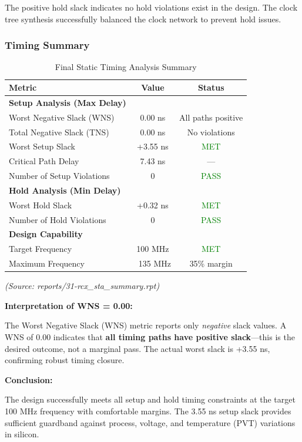 \documentclass[12pt,a4paper]{article}
\begin{document}
The positive hold slack indicates no hold violations exist in the design. The clock tree synthesis successfully balanced the clock network to prevent hold issues.

\subsubsection{Timing Summary}

\begin{table}[H]
\centering
\caption{Final Static Timing Analysis Summary}
\label{tab:final_sta}
\begin{tabular}{@{}lcc@{}}
\toprule
\textbf{Metric} & \textbf{Value} & \textbf{Status} \\
\midrule
\textbf{Setup Analysis (Max Delay)} & & \\
Worst Negative Slack (WNS) & 0.00 ns & All paths positive \\
Total Negative Slack (TNS) & 0.00 ns & No violations \\
Worst Setup Slack & +3.55 ns & \textcolor{green}{MET} \\
Critical Path Delay & 7.43 ns & — \\
Number of Setup Violations & 0 & \textcolor{green}{PASS} \\
\midrule
\textbf{Hold Analysis (Min Delay)} & & \\
Worst Hold Slack & +0.32 ns & \textcolor{green}{MET} \\
Number of Hold Violations & 0 & \textcolor{green}{PASS} \\
\midrule
\textbf{Design Capability} & & \\
Target Frequency & 100 MHz & \textcolor{green}{MET} \\
Maximum Frequency & ~135 MHz & 35\% margin \\
\bottomrule
\end{tabular}
\end{table}

\textit{(Source: reports/31-rcx\_sta\_summary.rpt)}

\textbf{Interpretation of WNS = 0.00:}

The Worst Negative Slack (WNS) metric reports only \textit{negative} slack values. A WNS of 0.00 indicates that \textbf{all timing paths have positive slack}—this is the desired outcome, not a marginal pass. The actual worst slack is +3.55 ns, confirming robust timing closure.

\textbf{Conclusion:}

The design successfully meets all setup and hold timing constraints at the target 100 MHz frequency with comfortable margins. The 3.55 ns setup slack provides sufficient guardband against process, voltage, and temperature (PVT) variations in silicon.
\end{document}
